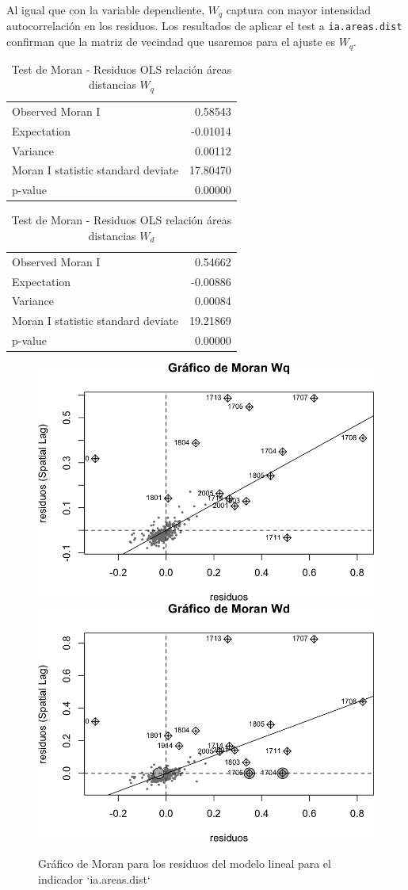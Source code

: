 \documentclass[12pt,]{book}
\begin{document}
Al igual que con la variable dependiente, \(W_q\) captura con mayor
intensidad autocorrelación en los residuos. Los resultados de aplicar el
test a \texttt{ia.areas.dist} confirman que la matriz de vecindad que
usaremos para el ajuste es \(W_q\).

\begin{table}

\caption{\label{tab:moran-resareadist-wq}Test de Moran - Residuos OLS relación áreas distancias $W_q$}
\centering
\begin{tabular}[t]{lr}
\toprule
  &  \\
\midrule
Observed Moran I & 0.58543\\
Expectation & -0.01014\\
Variance & 0.00112\\
Moran I statistic standard deviate & 17.80470\\
p-value & 0.00000\\
\bottomrule
\end{tabular}
\end{table}

\begin{table}

\caption{\label{tab:moran-resareadist-wd}Test de Moran - Residuos OLS relación áreas distancias $W_d$}
\centering
\begin{tabular}[t]{lr}
\toprule
  &  \\
\midrule
Observed Moran I & 0.54662\\
Expectation & -0.00886\\
Variance & 0.00084\\
Moran I statistic standard deviate & 19.21869\\
p-value & 0.00000\\
\bottomrule
\end{tabular}
\end{table}

\begin{figure}
\includegraphics[width=0.49\linewidth]{tesis-unigis_files/figure-latex/moranplot-resareasdist-w-1} \includegraphics[width=0.49\linewidth]{tesis-unigis_files/figure-latex/moranplot-resareasdist-w-2} \caption{Gráfico de Moran para los residuos del modelo lineal para el indicador `ia.areas.dist`}\label{fig:moranplot-resareasdist-w}
\end{figure}
\end{document}
